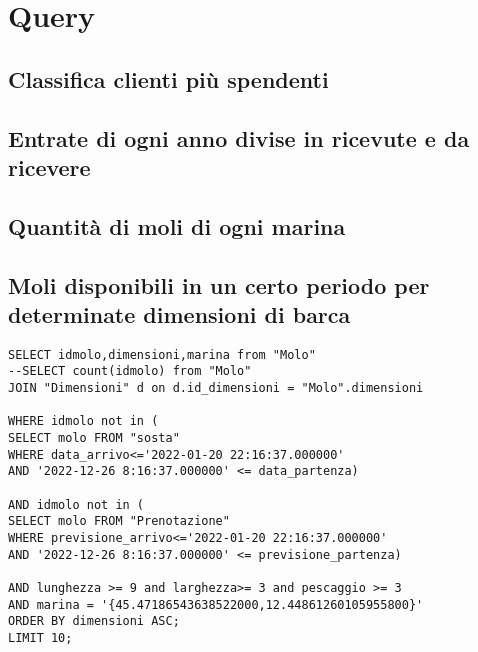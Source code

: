 


\section{Query}

\subsection{Classifica clienti più spendenti}
\subsection{Entrate di ogni anno divise in ricevute e da ricevere}
\subsection{Quantità di moli di ogni marina}

\subsection{Moli disponibili in un certo periodo per determinate dimensioni di barca}

\begin{lstlisting}
SELECT idmolo,dimensioni,marina from "Molo"
--SELECT count(idmolo) from "Molo"
JOIN "Dimensioni" d on d.id_dimensioni = "Molo".dimensioni

WHERE idmolo not in (
SELECT molo FROM "sosta"
WHERE data_arrivo<='2022-01-20 22:16:37.000000'
AND '2022-12-26 8:16:37.000000' <= data_partenza)

AND idmolo not in (
SELECT molo FROM "Prenotazione"
WHERE previsione_arrivo<='2022-01-20 22:16:37.000000'
AND '2022-12-26 8:16:37.000000' <= previsione_partenza)

AND lunghezza >= 9 and larghezza>= 3 and pescaggio >= 3
AND marina = '{45.47186543638522000,12.44861260105955800}'
ORDER BY dimensioni ASC;
LIMIT 10;
\end{lstlisting}

